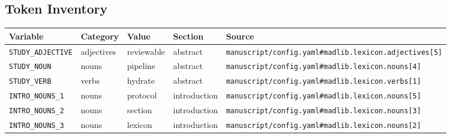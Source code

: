 \documentclass[
  english,
]{article}
\newcounter{none} %
\begin{document}
\subsection{Token Inventory}\label{token-inventory}

{\def\LTcaptype{none} %
\begin{longtable}[]{@{}
  >{\raggedright\arraybackslash}p{}
  >{\raggedright\arraybackslash}p{}
  >{\raggedright\arraybackslash}p{}
  >{\raggedright\arraybackslash}p{}
  >{\raggedright\arraybackslash}p{}@{}}
\toprule\noalign{}
\begin{minipage}[b]{\linewidth}\raggedright
Variable
\end{minipage} & \begin{minipage}[b]{\linewidth}\raggedright
Category
\end{minipage} & \begin{minipage}[b]{\linewidth}\raggedright
Value
\end{minipage} & \begin{minipage}[b]{\linewidth}\raggedright
Section
\end{minipage} & \begin{minipage}[b]{\linewidth}\raggedright
Source
\end{minipage} \\
\midrule\noalign{}
\endhead
\bottomrule\noalign{}
\endlastfoot
\texttt{STUDY\_ADJECTIVE} & adjectives & reviewable & abstract &
\texttt{manuscript/config.yaml\#madlib.lexicon.adjectives{[}5{]}} \\
\texttt{STUDY\_NOUN} & nouns & pipeline & abstract &
\texttt{manuscript/config.yaml\#madlib.lexicon.nouns{[}4{]}} \\
\texttt{STUDY\_VERB} & verbs & hydrate & abstract &
\texttt{manuscript/config.yaml\#madlib.lexicon.verbs{[}1{]}} \\
\texttt{INTRO\_NOUNS\_1} & nouns & protocol & introduction &
\texttt{manuscript/config.yaml\#madlib.lexicon.nouns{[}5{]}} \\
\texttt{INTRO\_NOUNS\_2} & nouns & section & introduction &
\texttt{manuscript/config.yaml\#madlib.lexicon.nouns{[}3{]}} \\
\texttt{INTRO\_NOUNS\_3} & nouns & lexicon & introduction &
\texttt{manuscript/config.yaml\#madlib.lexicon.nouns{[}2{]}} \\

\end{longtable}}
\end{document}
